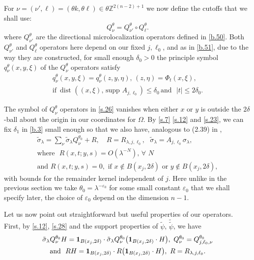 \documentclass[10pt]{amsart}
\newcommand{\la}{\lambda}
\newcommand{\e}{\varepsilon}
\newcommand{\1}{{\bf 1}}
\begin{document}
For $\nu=(\nu', \ell)=(\theta k, \theta \ell)\in \theta{\mathbb Z}^{2(n-2)+1}$ we now define the cutoffs that we shall use:
\begin{equation}\label{s.26}
Q^\theta_{\nu}=Q^\theta_{\nu'}\circ Q^\theta_\ell.
\end{equation}
where $Q^\theta_{\nu'}$ are the directional microlocalization operators defined in \eqref{b.50}. Both $Q^\theta_{\nu'}$ and $Q^\theta_\ell$ operators here depend on our fixed $j,\ell_0$, and as in \eqref{b.51}, due to the way they are constructed, for small enough $\delta_0>0$ the principle symbol $q^\theta_\nu(x,y,\xi)$ of the $Q_\nu^\theta$ operators satisfy
\begin{multline}\label{s.27}
q^\theta_\nu(x,y,\xi)=q^\theta_\nu(z,y,\eta), \, (z,\eta)=\Phi_t(x,\xi), 
\\ \text{if } \, \text{dist }((x,\xi), \, \text{supp }A_{j,\ell_0})\le \delta_0
\, \text{and } \, \, |t|\le 2\delta_0.
%
\end{multline}


The symbol of $Q_\nu^\theta$ operators  in \eqref{s.26} vanishes when either $x$ or $y$ is outside the $2\delta$-ball about
the origin in our coordinates for $\Omega$.  By \eqref{s.7} \eqref{s.12} and \eqref{s.23}, we can fix $\delta_1$ in \eqref{b.3} small enough so that
we also have, analogous to (2.39) in \cite{HSst},
\begin{multline}\label{s.28}
\tilde \sigma_\la = \sum_\nu \tilde \sigma_\la Q^{\theta_0}_\nu + R, \quad R=R_{\la,j,\ell_0},  \, \, 
\, \,  \tilde \sigma_\la =A_{j,\ell_0}\sigma_\la,  
\\
\text{where } \, \, R(x, t; y, s)=O(\la^{-N}), \, \forall \,\,N \,\,\, \\
\text{and } R(x,t;y,s)=0, \, \, \text{if } x\notin B(x_j,2\delta) \, \,
\text{or } y\notin B(x_j,2\delta),
\end{multline}
with bounds for the remainder kernel independent of $j$. Here unlike in the previous section we take $\theta_0=\la^{-\e_0}$ for some small constant $\e_0$
that we shall specify later, the choice of $\e_0$ depend on the dimension $n-1$.


Let us now point out straightforward but useful properties of our operators.  First, by \eqref{s.12}, \eqref{s.28}
and the support properties of $\tilde \psi$, $\tilde{\tilde \psi}$, we have
\begin{multline}\label{s.29}
\tilde \sigma_\la Q^{\theta_0}_\nu H=\1_{B(x_j,2\delta)} \cdot \tilde \sigma_\la Q^{\theta_0}_\nu\bigl(
\1_{B(x_j,2\delta)} \cdot H\bigr), \, \, Q^{\theta_0}_\nu =Q^{\theta_0}_{j,\ell_0,\nu}
\\
\text{and } \, \, RH=\1_{B(x_j,2\delta)}\cdot R \bigl(
\1_{B(x_j,2\delta)} \cdot H\bigr), \, \, R=R_{\la,j,\ell_0}.
\end{multline}
\end{document}
